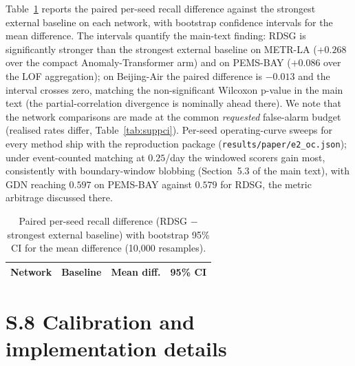 \documentclass[11pt,a4paper]{article}
\begin{document}
Table~\ref{tab:supppaired} reports the paired per-seed recall difference
against the strongest external baseline on each network, with bootstrap
confidence intervals for the mean difference. The intervals quantify the main-text finding: RDSG is significantly
stronger than the strongest external baseline on METR-LA ($+0.268$ over
the compact Anomaly-Transformer arm) and on PEMS-BAY ($+0.086$ over the
LOF aggregation); on Beijing-Air the paired difference is $-0.013$ and
the interval crosses zero, matching the non-significant Wilcoxon p-value
in the main text (the partial-correlation divergence is nominally ahead
there). We note that the network
comparisons are made at the common \emph{requested} false-alarm budget
(realised rates differ, Table~\ref{tab:suppci}). Per-seed operating-curve
sweeps for every method ship with the reproduction package
(\texttt{results/paper/e2\_oc.json}); under event-counted matching at
$0.25$/day the windowed scorers gain most, consistently with boundary-window blobbing
(Section~5.3 of the main text), with GDN reaching $0.597$ on PEMS-BAY
against $0.579$ for RDSG, the metric arbitrage discussed there.

\begin{table}[h]\centering\small
\caption{Paired per-seed recall difference (RDSG $-$ strongest external
baseline) with bootstrap 95\% CI for the mean difference (10,000
resamples).}
\label{tab:supppaired}
\begin{tabular}{llcc}
\hline
Network & Baseline & Mean diff. & 95\% CI \\
\hline

\end{tabular}
\end{table}

\clearpage
\section*{S.8 Calibration and implementation details}
\end{document}

